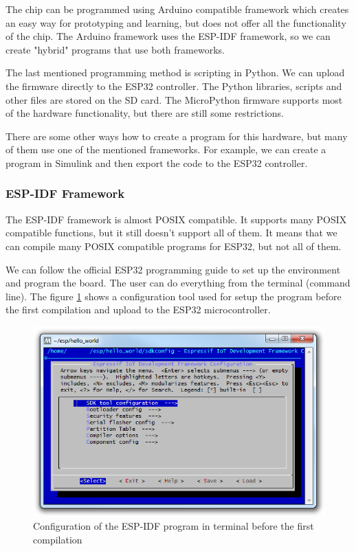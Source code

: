 The chip can be programmed using Arduino compatible framework \cite{espressif:ArduinoCore} which creates an easy way for prototyping and learning, but does not offer all the functionality of the chip. The Arduino framework uses the \ac{ESP-IDF} framework, so we can create "hybrid" programs that use both frameworks.

The last mentioned programming method is scripting in Python. We can upload the  \cite{MicroPython} firmware directly to the ESP32 controller. The Python libraries, scripts and other files are stored on the SD card. The MicroPython firmware supports most of the hardware functionality, but there are still some restrictions.

There are some other ways how to create a program for this hardware, but many of them use one of the mentioned frameworks. For example, we can create a program in Simulink and then export the code to the ESP32 controller. \cite{ArduinoSimulink}

\subsubsection{\ac{ESP-IDF} Framework}
The \ac{ESP-IDF} framework is almost \ac{POSIX} compatible. \cite{ESP32posix} It supports many \ac{POSIX} compatible functions, but it still doesn't support all of them. It means that we can compile many \ac{POSIX} compatible programs for ESP32, but not all of them.

We can follow the official ESP32 programming guide \cite{ESP32programmingGuide} to set up the environment and program the board. The user can do everything from the terminal (command line). The figure \ref{ESP32menuconfig} shows a configuration tool used for setup the program before the first compilation and upload to the ESP32 microcontroller.

\begin{figure}
    \centering
    \label{ESP32menuconfig}
    \caption{Configuration of the \ac{ESP-IDF} program in terminal before the first compilation}
    \includegraphics[width=\linewidth]{img/ESP32menuconfig.png}
\end{figure}


